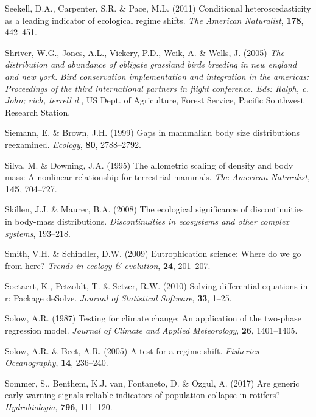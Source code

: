 \documentclass[12pt,twoside,openany]{reedthesis}
\begin{document}
\leavevmode\hypertarget{ref-seekell2011conditional}{}%
Seekell, D.A., Carpenter, S.R. \& Pace, M.L. (2011) Conditional heteroscedasticity as a leading indicator of ecological regime shifts. \emph{The American Naturalist}, \textbf{178}, 442--451.

\leavevmode\hypertarget{ref-shriver2005distribution}{}%
Shriver, W.G., Jones, A.L., Vickery, P.D., Weik, A. \& Wells, J. (2005) \emph{The distribution and abundance of obligate grassland birds breeding in new england and new york}. \emph{Bird conservation implementation and integration in the americas: Proceedings of the third international partners in flight conference. Eds: Ralph, c. John; rich, terrell d.}, US Dept. of Agriculture, Forest Service, Pacific Southwest Research Station.

\leavevmode\hypertarget{ref-siemann1999gaps}{}%
Siemann, E. \& Brown, J.H. (1999) Gaps in mammalian body size distributions reexamined. \emph{Ecology}, \textbf{80}, 2788--2792.

\leavevmode\hypertarget{ref-silva1995allometric}{}%
Silva, M. \& Downing, J.A. (1995) The allometric scaling of density and body mass: A nonlinear relationship for terrestrial mammals. \emph{The American Naturalist}, \textbf{145}, 704--727.

\leavevmode\hypertarget{ref-skillen2008ecological}{}%
Skillen, J.J. \& Maurer, B.A. (2008) The ecological significance of discontinuities in body-mass distributions. \emph{Discontinuities in ecosystems and other complex systems}, 193--218.

\leavevmode\hypertarget{ref-smith2009eutrophication}{}%
Smith, V.H. \& Schindler, D.W. (2009) Eutrophication science: Where do we go from here? \emph{Trends in ecology \& evolution}, \textbf{24}, 201--207.

\leavevmode\hypertarget{ref-deSolve}{}%
Soetaert, K., Petzoldt, T. \& Setzer, R.W. (2010) Solving differential equations in r: Package deSolve. \emph{Journal of Statistical Software}, \textbf{33}, 1--25.

\leavevmode\hypertarget{ref-solow1987testing}{}%
Solow, A.R. (1987) Testing for climate change: An application of the two-phase regression model. \emph{Journal of Climate and Applied Meteorology}, \textbf{26}, 1401--1405.

\leavevmode\hypertarget{ref-solow_test_2005}{}%
Solow, A.R. \& Beet, A.R. (2005) A test for a regime shift. \emph{Fisheries Oceanography}, \textbf{14}, 236--240.

\leavevmode\hypertarget{ref-sommer2017generic}{}%
Sommer, S., Benthem, K.J. van, Fontaneto, D. \& Ozgul, A. (2017) Are generic early-warning signals reliable indicators of population collapse in rotifers? \emph{Hydrobiologia}, \textbf{796}, 111--120.
\end{document}

